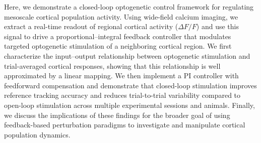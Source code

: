 \documentclass[11pt]{article}
\begin{document}
Here, we demonstrate a closed-loop optogenetic control framework for regulating mesoscale cortical population activity. Using wide-field calcium imaging, we extract a real-time readout of regional cortical activity ($\Delta F/F$) and use this signal to drive a proportional--integral feedback controller that modulates targeted optogenetic stimulation of a neighboring cortical region. We first characterize the input--output relationship between optogenetic stimulation and trial-averaged cortical responses, showing that this relationship is well approximated by a linear mapping. We then implement a PI controller with feedforward compensation and demonstrate that closed-loop stimulation improves reference tracking accuracy and reduces trial-to-trial variability compared to open-loop stimulation across multiple experimental sessions and animals. Finally, we discuss the implications of these findings for the broader goal of using feedback-based perturbation paradigms to investigate and manipulate cortical population dynamics.



\end{document}
